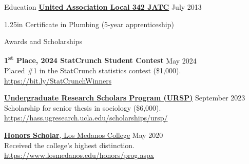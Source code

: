 \documentclass[
	12pt, %
]{resume} %
\newcommand{\righthandindent}{1.25in}
\begin{document}
\begin{rSection}{Education}
    \href{https://ua342.org/training}{\textbf{United Association Local 342 JATC}} \hfill July 2013
\begin{adjustwidth}{20pt}{\righthandindent}
    \vspace{-6pt}
    Certificate in Plumbing (5-year apprenticeship)
\end{adjustwidth}

\end{rSection}

\begin{rSection}{Awards and Scholarships}

\textbf{1\textsuperscript{st} Place, 2024 StatCrunch Student Contest} \hfill May 2024\\
\hspace*{20pt}Placed \#1 in the StatCrunch statistics contest (\$\thinspace{}1,000).\\
\hspace*{20pt}\href{https://bit.ly/StatCrunchWinners}{https://bit.ly/StatCrunchWinners}

\href{https://hass.ugresearch.ucla.edu/scholarships/ursp/students/}{\textbf{Undergraduate Research Scholars Program (URSP)}} \hfill September 2023 \\
\hspace*{20pt}Scholarship for senior thesis in sociology (\$\thinspace{}6,000).\\
\hspace*{20pt}\href{https://hass.ugresearch.ucla.edu/scholarships/ursp/}{https://hass.ugresearch.ucla.edu/scholarships/ursp/}

\href{https://www.losmedanos.edu/honors/prog.aspx\#:~:text=Honors\%20Scholar\%20Requirements}{\textbf{Honors Scholar}, Los Medanos College} \hfill May 2020\\
\hspace*{20pt}Received the college’s highest distinction.\\
\hspace*{20pt}\href{https://www.losmedanos.edu/honors/prog.aspx}{https://www.losmedanos.edu/honors/prog.aspx}
\end{rSection}
\end{document}
